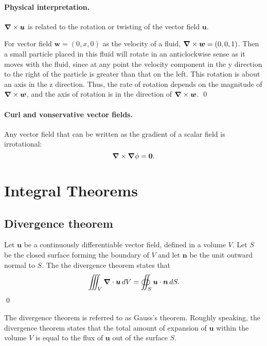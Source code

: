 \paragraph{Physical interpretation. }
$\bm{\nabla} \times \bm{u}$ is related to the rotation or twisting of the vector field $\bm{u}$. 
\begin{example}
    For vector field $\bm{w} = (0,x,0)$ as the velocity of a fluid, $\bm{\nabla} \times \bm{w}= (0,0,1)$. 
    Then a small particle placed in this fluid will rotate in an anticlockwise sense as it moves with the fluid, since at any point the velocity component in the y direction to the right of the particle is greater than that on the left. 
    This rotation is about an axis in the z direction. 
    Thus, the rate of rotation depends on the magnitude of $\bm{\nabla} \times \bm{w}$, and the axis of rotation is in the direction of $\bm{\nabla} \times \bm{w}$.
    \qed
\end{example}

\paragraph{Curl and vonservative vector fields. }
Any vector field that can be written as the gradient of a scalar field is irrotational:
\begin{equation}
    \bm{\nabla} \times \bm{\nabla} \phi=\mathbf{0}.  
\end{equation}

\section{Integral Theorems}
\subsection{Divergence theorem}
\begin{theorem}
    Let $\bm{u}$ be a continuously differentiable vector field, defined in a volume $V$. 
    Let $S$ be the closed surface forming the boundary of $V$ and let $\bm{n}$ be the unit outward normal to $S$. 
    The the divergence theorem states that 
    \begin{equation}
        \iiint_{V} \bm{\nabla} \cdot \bm{u} \, d V
        =\oiint_{S} \bm{u} \cdot \bm{n} \, d S .
    \end{equation}
    \qed
\end{theorem}

The divergence theorem is referred to as Gauss's theorem.
Roughly speaking, the divergence theorem states that the total amount of expansion of $\bm{u}$ within the volume $V$ is equal to the flux of $\bm{u}$ out of the surface $S$. 

